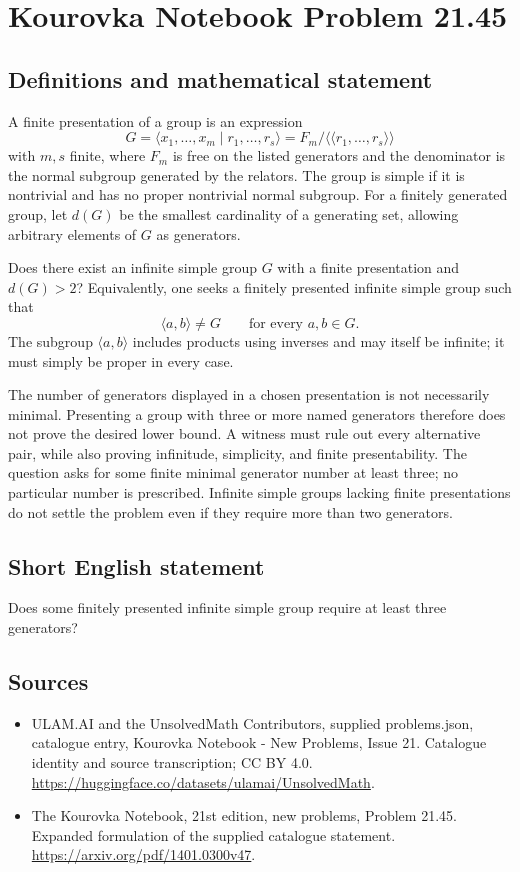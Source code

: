 \documentclass[11pt,a4paper]{article}
\begin{document}
\section*{Kourovka Notebook Problem 21.45}\label{statement}

\subsection{Definitions and mathematical statement}
A finite presentation of a group is an expression
\[
 G=\langle x_1,\ldots,x_m\mid r_1,\ldots,r_s\rangle
   =F_m/\langle\!\langle r_1,\ldots,r_s\rangle\!\rangle
\]
with $m,s$ finite, where $F_m$ is free on the listed generators and
the denominator is the normal subgroup generated by the relators.
The group is simple if it is nontrivial and has no proper nontrivial
normal subgroup.
For a finitely generated group, let $d(G)$ be the smallest cardinality
of a generating set, allowing arbitrary elements of $G$ as generators.

Does there exist an infinite simple group $G$ with a finite presentation
and $d(G)>2$? Equivalently, one seeks a finitely presented infinite simple
group such that
\[
 \langle a,b\rangle\ne G\qquad\text{for every }a,b\in G.
\]
The subgroup $\langle a,b\rangle$ includes products using inverses and
may itself be infinite; it must simply be proper in every case.

The number of generators displayed in a chosen presentation is not
necessarily minimal. Presenting a group with three or more named
generators therefore does not prove the desired lower bound. A witness
must rule out every alternative pair, while also proving infinitude,
simplicity, and finite presentability. The question asks for some finite
minimal generator number at least three; no particular number is prescribed.
Infinite simple groups lacking finite presentations do not settle the
problem even if they require more than two generators.
\subsection{Short English statement}
Does some finitely presented infinite simple group require at least three generators?
\subsection{Sources}
\begin{itemize}
\item[S1] ULAM.AI and the UnsolvedMath Contributors, supplied problems.json, catalogue entry, Kourovka Notebook - New Problems, Issue 21. Catalogue identity and source transcription; CC BY 4.0.
\url{https://huggingface.co/datasets/ulamai/UnsolvedMath}.
\item[S2] The Kourovka Notebook, 21st edition, new problems, Problem 21.45. Expanded formulation of the supplied catalogue statement.
\url{https://arxiv.org/pdf/1401.0300v47}.
\end{itemize}
\end{document}
